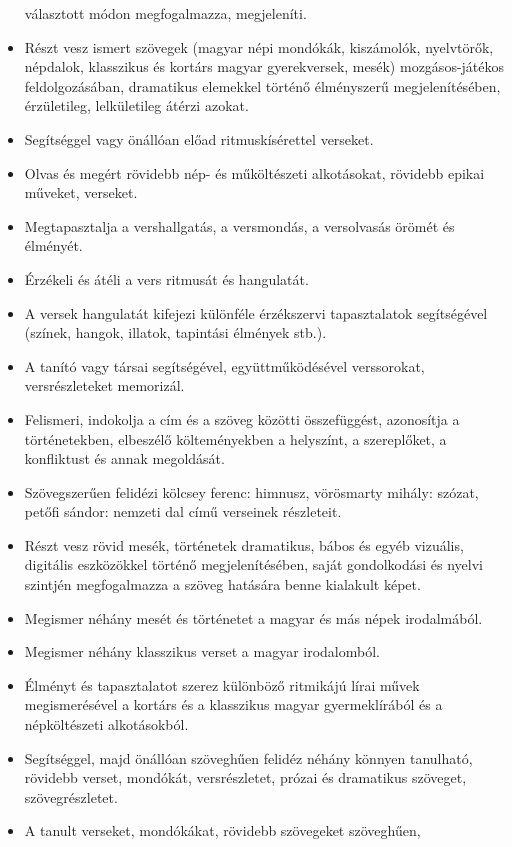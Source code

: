 \begin{itemize}
  választott módon megfogalmazza, megjeleníti.
\item
  Részt vesz ismert szövegek (magyar népi mondókák, kiszámolók,
  nyelvtörők, népdalok, klasszikus és kortárs magyar gyerekversek,
  mesék) mozgásos-játékos feldolgozásában, dramatikus elemekkel történő
  élményszerű megjelenítésében, érzületileg, lelkületileg átérzi azokat.
\item
  Segítséggel vagy önállóan előad ritmuskísérettel verseket.
\item
  Olvas és megért rövidebb nép- és műköltészeti alkotásokat, rövidebb
  epikai műveket, verseket.
\item
  Megtapasztalja a vershallgatás, a versmondás, a versolvasás örömét és
  élményét.
\item
  Érzékeli és átéli a vers ritmusát és hangulatát.
\item
  A versek hangulatát kifejezi különféle érzékszervi tapasztalatok
  segítségével (színek, hangok, illatok, tapintási élmények stb.).
\item
  A tanító vagy társai segítségével, együttműködésével verssorokat,
  versrészleteket memorizál.
\item
  Felismeri, indokolja a cím és a szöveg közötti összefüggést,
  azonosítja a történetekben, elbeszélő költeményekben a helyszínt, a
  szereplőket, a konfliktust és annak megoldását.
\item
  Szövegszerűen felidézi kölcsey ferenc: himnusz, vörösmarty mihály:
  szózat, petőfi sándor: nemzeti dal című verseinek részleteit.
\item
  Részt vesz rövid mesék, történetek dramatikus, bábos és egyéb
  vizuális, digitális eszközökkel történő megjelenítésében, saját
  gondolkodási és nyelvi szintjén megfogalmazza a szöveg hatására benne
  kialakult képet.
\item
  Megismer néhány mesét és történetet a magyar és más népek irodalmából.
\item
  Megismer néhány klasszikus verset a magyar irodalomból.
\item
  Élményt és tapasztalatot szerez különböző ritmikájú lírai művek
  megismerésével a kortárs és a klasszikus magyar gyermeklírából és a
  népköltészeti alkotásokból.
\item
  Segítséggel, majd önállóan szöveghűen felidéz néhány könnyen
  tanulható, rövidebb verset, mondókát, versrészletet, prózai és
  dramatikus szöveget, szövegrészletet.
\item
  A tanult verseket, mondókákat, rövidebb szövegeket szöveghűen,

\end{itemize}
